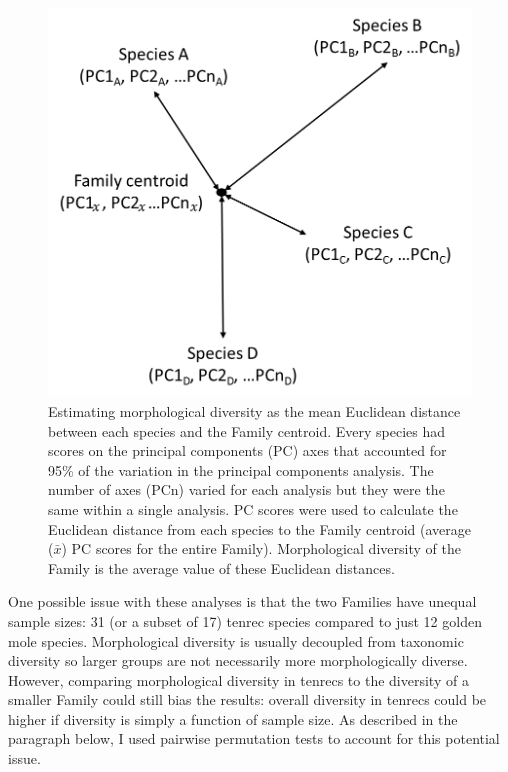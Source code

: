 	\begin{figure}[!htbp]
	\centering
	\includegraphics [width=0.7\linewidth, height=0.7\textheight, keepaspectratio]{Disparity/writing/figures/Centroids.png}
	\caption[Calculating diversity as mean Euclidean distance to Family centroid.]
		{Estimating morphological diversity as the mean Euclidean distance between each species and the Family centroid. Every species had scores on the principal components (PC) axes that accounted for 95\% of the variation in the principal components analysis. The number of axes (PCn) varied for each analysis but they were the same within a single analysis. PC scores were used to calculate the Euclidean distance from each species to the Family centroid (average (\begin{math}
			\bar{x}
			\end{math}) PC scores for the entire Family). Morphological diversity of the Family is the average value of these Euclidean distances.}
	\label{fig:centroids}
	\end{figure}


	
	One possible issue with these analyses is that the two Families have unequal sample sizes: 31 (or a subset of 17) tenrec species compared to just 12 golden mole species. Morphological diversity is usually decoupled from taxonomic diversity \citep[e.g.][]{Ruta2013, Hopkins2013} so larger groups are not necessarily more morphologically diverse. However, comparing morphological diversity in tenrecs to the diversity of a smaller Family could still bias the results: overall diversity in tenrecs could be higher if diversity is simply a function of sample size. As described in the paragraph below, I used pairwise permutation tests to account for this potential issue. 

